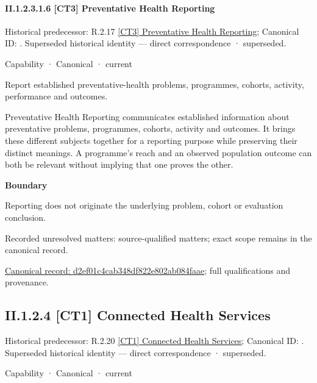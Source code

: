 \paragraph*{II.1.2.3.1.6 [CT3] Preventative Health Reporting}
\label{navigation:II.1.2.3.1.6}

{\small Historical predecessor: R.2.17 \hyperref[element:4faef45b4ebe4fa69e57c3d81bfea05f]{[CT3] Preventative Health Reporting}; Canonical ID: \texttt{}. Superseded historical identity — direct correspondence · superseded.}\par
\label{element:d2ef01c4cab348df822e802ab084faae}
{\small Capability · Canonical · current}\par

Report established preventative-health problems, programmes, cohorts, activity, performance and outcomes.



Preventative Health Reporting communicates established information about preventative problems, programmes, cohorts, activity and outcomes. It brings these different subjects together for a reporting purpose while preserving their distinct meanings. A programme's reach and an observed population outcome can both be relevant without implying that one proves the other.



\textbf{Boundary}



Reporting does not originate the underlying problem, cohort or evaluation conclusion.


{\small Recorded unresolved matters: source-qualified matters; exact scope remains in the canonical record.}\par
{\footnotesize \href{../../../../../../../continuum/strategy/capability/d2ef01c4cab348df822e802ab084faae.md}{Canonical record: d2ef01c4cab348df822e802ab084faae}; full qualifications and provenance.}\par
\subsection*{II.1.2.4 [CT1] Connected Health Services}
\label{navigation:II.1.2.4}

{\small Historical predecessor: R.2.20 \hyperref[element:48f01ef8b0e6431c85cf4f40cf8f94c3]{[CT1] Connected Health Services}; Canonical ID: \texttt{}. Superseded historical identity — direct correspondence · superseded.}\par
\label{element:3ef397463e584737b367e93f0bf1d85d}
{\small Capability · Canonical · current}\par

